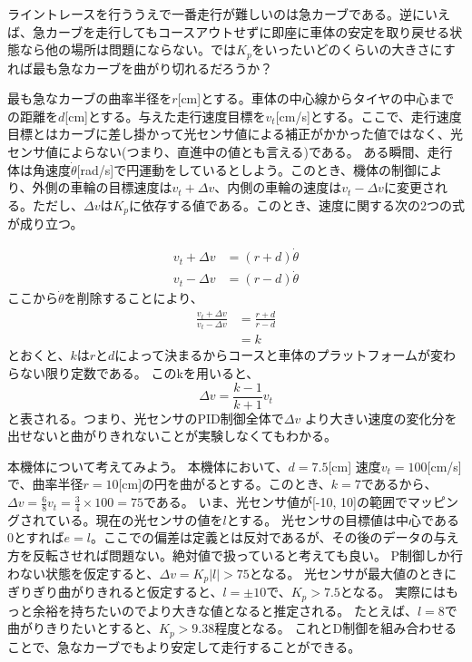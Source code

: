 \documentclass{ltjsreport}
\begin{document}
ライントレースを行ううえで一番走行が難しいのは急カーブである。逆にいえば、急カーブを走行してもコースアウトせずに即座に車体の安定を取り戻せる状態なら他の場所は問題にならない。では$K_p$をいったいどのくらいの大きさにすれば最も急なカーブを曲がり切れるだろうか？

最も急なカーブの曲率半径を$r$[cm]とする。車体の中心線からタイヤの中心までの距離を$d$[cm]とする。与えた走行速度目標を$v_t$[cm/s]とする。ここで、走行速度目標とはカーブに差し掛かって光センサ値による補正がかかった値ではなく、光センサ値によらない(つまり、直進中の値とも言える)である。
ある瞬間、走行体は角速度$\dot{\theta}$[rad/s]で円運動をしているとしよう。このとき、機体の制御により、外側の車輪の目標速度は$v_t + \Delta v$、内側の車輪の速度は$v_t - \Delta v$に変更される。ただし、$\Delta v $は$K_p$に依存する値である。このとき、速度に関する次の2つの式が成り立つ。

\begin{align}
  v_t + \Delta v &= (r+d)\dot{\theta}\\
  v_t - \Delta v &= (r-d)\dot{\theta}
\end{align}
ここから$\dot{\theta}$を削除することにより、
\begin{align}
  \frac{v_t+ \Delta v}{v_t-\Delta v} &= \frac{r+d}{r-d}\\
                                    &= k
\end{align}
とおくと、$k$は$r$と$d$によって決まるからコースと車体のプラットフォームが変わらない限り定数である。
このkを用いると、
\[
  \Delta v = \frac{k-1}{k+1}v_t
\]
と表される。つまり、光センサのPID制御全体で$\Delta v$ より大きい速度の変化分を出せないと曲がりきれないことが実験しなくてもわかる。

本機体について考えてみよう。
本機体において、$d=7.5$[cm]
速度$v_t =100$[cm/s]で、曲率半径$r=10$[cm]の円を曲がるとする。このとき、$k = 7$であるから、
$\Delta v = \frac{6}{8}v_t = \frac{3}{4}\times 100 = 75$である。
いま、光センサ値が[-10, 10]の範囲でマッピングされている。現在の光センサの値を$l$とする。
光センサの目標値は中心である0とすれば$e=l$。ここでの偏差は定義とは反対であるが、その後のデータの与え方を反転させれば問題ない。絶対値で扱っていると考えても良い。
P制御しか行わない状態を仮定すると、$\Delta v = K_p |l| > 75$となる。
光センサが最大値のときにぎりぎり曲がりきれると仮定すると、$l=\pm 10$で、$K_p > 7.5$となる。
実際にはもっと余裕を持ちたいのでより大きな値となると推定される。
たとえば、$l=8$で曲がりきりたいとすると、$K_p > 9.38$程度となる。
これとD制御を組み合わせることで、急なカーブでもより安定して走行することができる。
\end{document}
